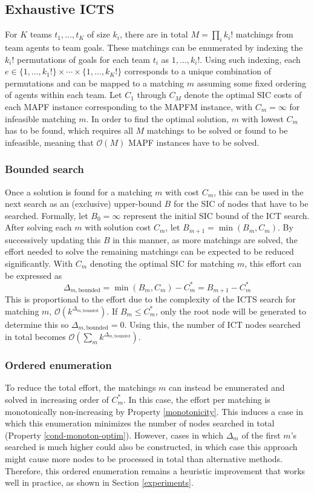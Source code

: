 \documentclass[english]{article}
\begin{document}
	\subsection{Exhaustive ICTS}
	\label{exhaustive}
	For $K$ teams $t_1,\ldots,t_K$ of size $k_i$, there are in total $M = \prod_{i} k_i!$ matchings from team agents to team goals. These matchings can be enumerated by indexing the $k_i!$ permutations of goals for each team $t_i$ as $1,\ldots,k_i!$. Using such indexing, each $e \in \{1,\ldots,k_1!\} \times \cdots \times \{1,\ldots,k_K!\}$ corresponds to a unique combination of permutations and can be mapped to a matching $m$ assuming some fixed ordering of agents within each team. Let $C_1$ through $C_M$ denote the optimal SIC costs of each MAPF instance corresponding to the MAPFM instance, with $C_m = \infty$ for infeasible matching $m$. In order to find the optimal solution, $m$ with lowest $C_m$ has to be found, which requires all $M$ matchings to be solved or found to be infeasible, meaning that $\mathcal{O}(M)$ MAPF instances have to be solved. 
	\subsubsection{Bounded search}
	Once a solution is found for a matching $m$ with cost $C_m$, this can be used in the next search as an (exclusive) upper-bound $B$ for the SIC of nodes that have to be searched. Formally, let $B_0 = \infty$ represent the initial SIC bound of the ICT search. After solving each $m$ with solution cost $C_m$, let $B_{m+1} = \min(B_m,C_m)$. By successively updating this $B$ in this manner, as more matchings are solved, the effort needed to solve the remaining matchings can be expected to be reduced significantly. With $C_m$ denoting the optimal SIC for matching $m$, this effort can be expressed as	
	\[\Delta_{m,\text{bounded}} = \min(B_m,C_m) - C^*_m = B_{m+1} - C^*_m\]
	This is proportional to the effort due to the complexity of the ICTS search for matching $m$, $\mathcal{O}(k^{\Delta_{m,\text{bounded}}})$.
	If $B_m \leq C^*_m$, only the root node will be generated to determine this so $\Delta_{m,\text{bounded}} = 0$.
	Using this, the number of ICT nodes searched in total becomes $\mathcal{O}(\sum_m k^{\Delta_{m,\text{bounded}}})$.
	\subsubsection{Ordered enumeration}
	\label{ordered-enum}
	To reduce the total effort, the matchings $m$ can instead be enumerated and solved in increasing order of $C^*_m$. In this case, the effort per matching is monotonically non-increasing by Property \ref{monotonicity}. This induces a case in which this enumeration minimizes the number of nodes searched in total (Property \ref{cond-monoton-optim}). However, cases in which $\Delta_m$ of the first $m$'s searched is much higher could also be constructed, in which case this approach might cause more nodes to be processed in total than alternative methods. Therefore, this ordered enumeration remains a heuristic improvement that works well in practice, as shown in Section \ref{experiments}.
	
\end{document}
